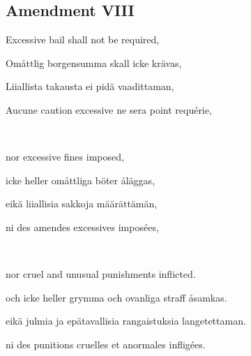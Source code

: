 \documentclass[a4,landscape,12pt]{article}
\begin{document}
\subsection*{Amendment VIII}
\begin{minipage}[t]{0.22\textwidth}
Excessive bail shall not be required,
\end{minipage}\textwidth
\begin{minipage}[t]{0.22\textwidth}
Omåttlig borgensumma skall icke krävas,
\end{minipage}\textwidth
\begin{minipage}[t]{0.22\textwidth}
Liiallista takausta ei pidä vaadittaman,
\end{minipage}\textwidth
\begin{minipage}[t]{0.22\textwidth}
Aucune caution excessive ne sera point requérie,
\end{minipage}

~

\begin{minipage}[t]{0.22\textwidth}
nor excessive fines imposed,
\end{minipage}\textwidth
\begin{minipage}[t]{0.22\textwidth}
icke heller omåttliga böter åläggas,
\end{minipage}\textwidth
\begin{minipage}[t]{0.22\textwidth}
eikä liiallisia sakkoja määrättämän,
\end{minipage}\textwidth
\begin{minipage}[t]{0.22\textwidth}
ni des amendes excessives imposées,
\end{minipage}

~

\begin{minipage}[t]{0.22\textwidth}
nor cruel and unusual punishments inflicted.
\end{minipage}\textwidth
\begin{minipage}[t]{0.22\textwidth}
och icke heller grymma och ovanliga straff åsamkas.
\end{minipage}\textwidth
\begin{minipage}[t]{0.22\textwidth}
eikä julmia ja epätavallisia rangaistuksia langetettaman.
\end{minipage}\textwidth
\begin{minipage}[t]{0.22\textwidth}
ni des punitions cruelles et anormales infligées.
\end{minipage}
\end{document}

